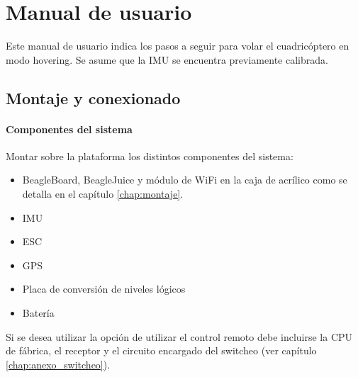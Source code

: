 \documentclass[main]{subfiles}
\begin{document}
\chapter{Manual de usuario}
\label{chap:anexo_manual}

Este manual de usuario indica los pasos a seguir para volar el cuadric\'optero en modo hovering. Se asume que la IMU se encuentra previamente calibrada. 

\section{Montaje y conexionado}

\subsubsection{Componentes del sistema}
Montar sobre la plataforma los distintos componentes del sistema:
\begin{itemize}
\item BeagleBoard, BeagleJuice y m\'odulo de WiFi en la caja de acr\'ilico como se detalla en el cap\'itulo \ref{chap:montaje}.
\item IMU
\item ESC
\item GPS
\item Placa de conversi\'on de niveles l\'ogicos
\item Bater\'ia
\end{itemize}
Si se desea utilizar la opci\'on de utilizar el control remoto debe incluirse la CPU de f\'abrica, el receptor y el circuito encargado del switcheo (ver cap\'itulo \ref{chap:anexo_switcheo}).
\end{document}
